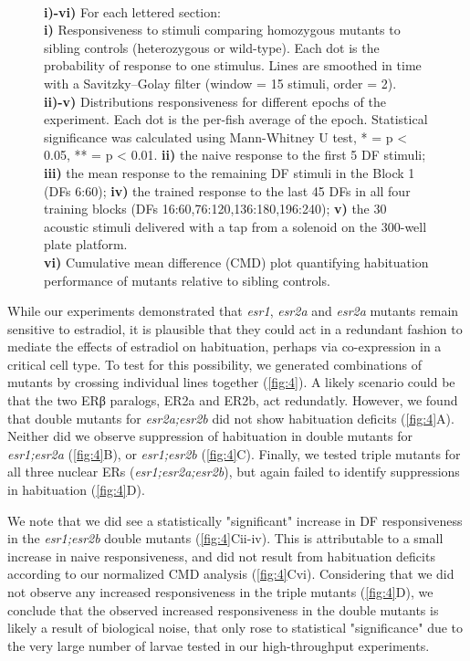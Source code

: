 \documentclass[9pt,lineno]{RandlettLab_elife}
\begin{document}
{\begin{figure}
\begin{fullwidth}
\begin{center}
{\\ \textbf{i)-vi)} For each lettered section: 
\\ \textbf{i)} Responsiveness to stimuli comparing homozygous mutants to sibling controls (heterozygous or wild-type). 
Each dot is the probability of response to one stimulus. Lines are smoothed in time with a Savitzky–Golay filter (window = 15 stimuli, order = 2).
\\ \textbf{ii)-v)} Distributions responsiveness for different epochs of the experiment. Each dot is the per-fish average of the epoch. 
Statistical significance was calculated using Mann-Whitney U test, * = p < 0.05, ** = p < 0.01.
\textbf{ii)} the naive response to the first 5 DF stimuli; \textbf{iii)} the mean response to the remaining DF stimuli in the Block 1 (DFs 6:60); \textbf{iv)} the trained response to the last 45 DFs in all four training blocks (DFs 16:60,76:120,136:180,196:240); \textbf{v)} the 30 acoustic stimuli delivered with a tap from a solenoid on the 300-well plate platform.
\\ \textbf{vi)} Cumulative mean difference (CMD) plot quantifying habituation performance of mutants relative to sibling controls.
}
\label{fig:4}

\end{center}
\end{fullwidth}
\end{figure}

While our experiments demonstrated that \emph{esr1}, \emph{esr2a} and \emph{esr2a} mutants remain sensitive to estradiol, it is plausible that they could act in a redundant fashion to mediate the effects of estradiol on habituation, perhaps via co-expression in a critical cell type. 
To test for this possibility, we generated combinations of mutants by crossing individual lines together (\autoref{fig:4}). 
A likely scenario could be that the two ERβ paralogs, ER2a and ER2b, act redundatly. 
However, we found that double mutants for \emph{esr2a;esr2b} did not show habituation deficits (\autoref{fig:4}A).
Neither did we observe suppression of habituation in double mutants for \emph{esr1;esr2a} (\autoref{fig:4}B), or \emph{esr1;esr2b} (\autoref{fig:4}C). 
Finally, we tested triple mutants for all three nuclear ERs (\emph{esr1;esr2a;esr2b}), but again failed to identify suppressions in habituation (\autoref{fig:4}D).

We note that we did see a statistically "significant" increase in DF responsiveness in the \emph{esr1;esr2b} double mutants (\autoref{fig:4}Cii-iv). 
This is attributable to a small increase in naive responsiveness, and did not result from habituation deficits according to our normalized CMD analysis (\autoref{fig:4}Cvi).
Considering that we did not observe any increased responsiveness in the triple mutants (\autoref{fig:4}D), we conclude that the observed increased responsiveness in the double mutants is likely a result of biological noise, that only rose to statistical "significance" due to the very large number of larvae tested in our high-throughput experiments.

}
\end{document}
